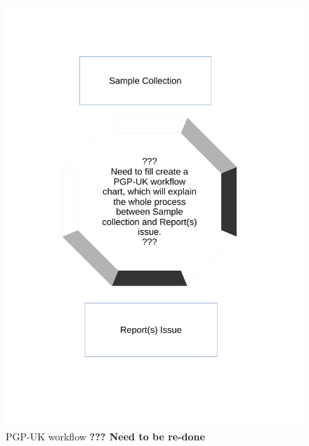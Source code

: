 \documentclass[english]{article}
\begin{document}
\begin{figure}
\includegraphics[width = \textwidth]{img/pgpuk.pdf}
\caption{PGP-UK workflow \newline
\textbf{??? Need to be re-done}}
\label{fig: PGP-UK workflow}
\end{figure}
\end{document}
